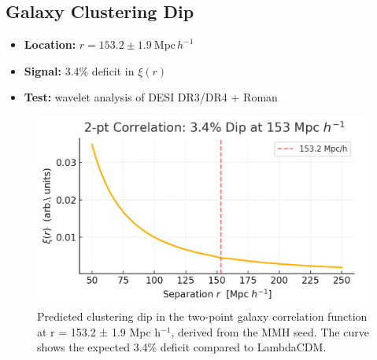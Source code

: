 \documentclass[11pt,a4paper]{article}
\begin{document}
\subsection{Galaxy Clustering Dip}
\begin{itemize}
  \item \textbf{Location:} $r = 153.2 \pm 1.9~\mathrm{Mpc}\,h^{-1}$
  \item \textbf{Signal:} 3.4\% deficit in $\xi(r)$
  \item \textbf{Test:} wavelet analysis of DESI DR3/DR4 + Roman
\end{itemize}
\FloatBarrier
\begin{figure}[htbp]
  \centering
  \includegraphics[width=0.75\linewidth]{figs/153mpc_dip.png}
  \caption{Predicted clustering dip in the two-point galaxy correlation function at r = 153.2 ± 1.9 Mpc h$^{-1}$, derived from the MMH seed. The curve shows the expected 3.4\% deficit compared to LambdaCDM.}
  \label{fig:clustering_dip}
\end{figure}
\FloatBarrier
\end{document}
